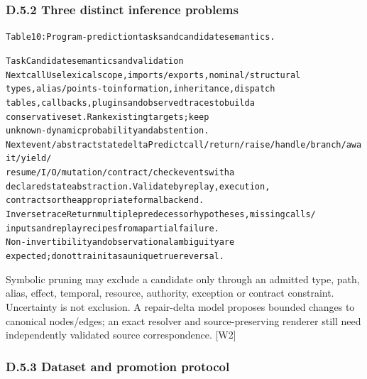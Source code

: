 \documentclass{article}
\begin{document}
\subsubsection*{D.5.2 Three distinct inference problems}


\begingroup\fontsize{7}{8.4}\selectfont
\begin{alltt}
Table 10: Program-prediction tasks and candidate semantics.
\end{alltt}\endgroup

\begingroup\fontsize{7}{8.4}\selectfont
\begin{alltt}
Task                                         Candidate semantics and validation
Next call                                    Use lexical scope, imports/exports, nominal/structural
                                             types, alias/points-to information, inheritance, dispatch
                                             tables, callbacks, plugins and observed traces to build a
                                             conservative set. Rank existing targets; keep
                                             unknown-dynamic probability and abstention.
Next event / abstract state delta            Predict call/return/raise/handle/branch/await/yield/
                                             resume/I/O/mutation/contract/check events with a
                                             declared state abstraction. Validate by replay, execution,
                                             contracts or the appropriate formal backend.
Inverse trace                                Return multiple predecessor hypotheses, missing calls/
                                             inputs and replay recipes from a partial failure.
                                             Non-invertibility and observational ambiguity are
                                             expected; do not train it as a unique true reversal.
\end{alltt}\endgroup



Symbolic pruning may exclude a candidate only through an admitted type, path, alias, effect, temporal,
resource, authority, exception or contract constraint. Uncertainty is not exclusion. A repair-delta
model proposes bounded changes to canonical nodes/edges; an exact resolver and source-preserving
renderer still need independently validated source correspondence. [W2]

\subsubsection*{D.5.3 Dataset and promotion protocol}
\end{document}
